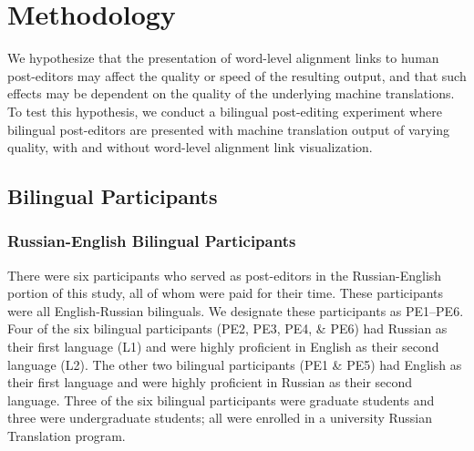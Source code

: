 ﻿%

\section{Methodology}
\label{sec:methodology}

We hypothesize that the presentation of word-level alignment links to human post-editors may affect the quality or speed of the resulting output, and that such effects may be dependent on the quality of the underlying machine translations.
%
To test this hypothesis, we conduct a bilingual post-editing experiment where bilingual post-editors are presented with machine translation output of varying quality, with and without word-level alignment link visualization. 





\subsection{Bilingual Participants}


\subsubsection{Russian-English Bilingual Participants}
There were six participants who served as post-editors in the Russian-English portion of this study, all of whom were paid for their time.
%
These participants were all English-Russian bilinguals.
%
We designate these participants as PE1--PE6.
%
Four of the six bilingual participants (PE2, PE3, PE4, \& PE6) had Russian as their first language (L1) and were highly proficient in English as their second language (L2).
%
The other two bilingual participants (PE1 \& PE5) had English as their first language and were highly proficient in Russian as their second language.
%
Three of the six bilingual participants were graduate students and three were undergraduate students; all were enrolled in a university Russian Translation program. %

%

